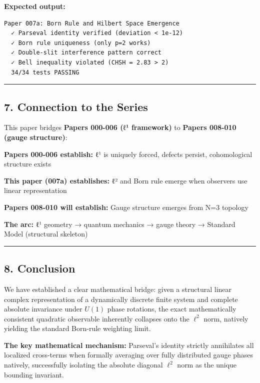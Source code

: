 \documentclass[
]{article}
\begin{document}
\textbf{Expected output:}

\begin{verbatim}
Paper 007a: Born Rule and Hilbert Space Emergence
  ✓ Parseval identity verified (deviation < 1e-12)
  ✓ Born rule uniqueness (only p=2 works)
  ✓ Double-slit interference pattern correct
  ✓ Bell inequality violated (CHSH = 2.83 > 2)
  34/34 tests PASSING
\end{verbatim}

\begin{center}\rule{0.5\linewidth}{0.5pt}\end{center}

\subsection{7. Connection to the Series}\label{connection-to-the-series}

This paper bridges \textbf{Papers 000-006 (ℓ¹ framework)} to
\textbf{Papers 008-010 (gauge structure)}:

\textbf{Papers 000-006 establish:} ℓ¹ is uniquely forced, defects
persist, cohomological structure exists

\textbf{This paper (007a) establishes:} ℓ² and Born rule emerge when
observers use linear representation

\textbf{Papers 008-010 will establish:} Gauge structure emerges from N=3
topology

\textbf{The arc:} ℓ¹ geometry → quantum mechanics → gauge theory →
Standard Model (structural skeleton)

\begin{center}\rule{0.5\linewidth}{0.5pt}\end{center}

\subsection{8. Conclusion}\label{conclusion}

We have established a clear mathematical bridge: given a structural
linear complex representation of a dynamically discrete finite system
and complete absolute invariance under \(U(1)\) phase rotations, the
exact mathematically consistent quadratic observable inherently
collapses onto the \(\ell^2\) norm, natively yielding the standard
Born-rule weighting limit.

\textbf{The key mathematical mechanism:} Parseval's identity strictly
annihilates all localized cross-terms when formally averaging over fully
distributed gauge phases natively, successfully isolating the absolute
diagonal \(\ell^2\) norm as the unique bounding invariant.
\end{document}
